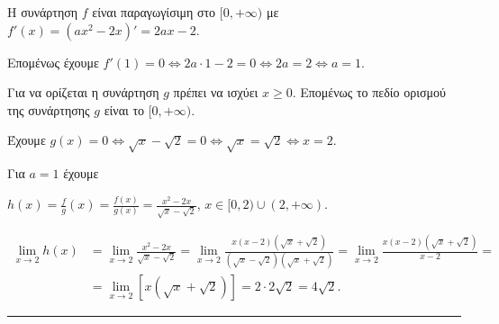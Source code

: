 \begin{alist}
\item Η συνάρτηση $f$ είναι παραγωγίσιμη στο $[0, +\infty)$ με $f'(x) = (ax^2 - 2x)' = 2ax - 2$.

Επομένως έχουμε $f'(1) = 0 \Leftrightarrow 2a \cdot 1 - 2 = 0 \Leftrightarrow 2a = 2 \Leftrightarrow a = 1$.

\item 
\begin{rlist}
\item Για να ορίζεται η συνάρτηση $g$ πρέπει να ισχύει $x \ge 0$. Επομένως το πεδίο ορισμού της συνάρτησης $g$ είναι το $[0, +\infty)$.

\item Έχουμε $g(x) = 0 \Leftrightarrow \sqrt{x} - \sqrt{2} = 0 \Leftrightarrow \sqrt{x} = \sqrt{2} \Leftrightarrow x = 2$.
\end{rlist}

\item Για $a=1$ έχουμε
\begin{rlist}
\item $h(x) = \frac{f}{g}(x) = \frac{f(x)}{g(x)} = \frac{x^2 - 2x}{\sqrt{x} - \sqrt{2}}$, $x \in [0, 2) \cup (2, +\infty)$.

\item 
\[
\begin{aligned}
\lim\limits_{x \to 2} h(x) &= \lim\limits_{x \to 2} \frac{x^2 - 2x}{\sqrt{x} - \sqrt{2}} = \lim\limits_{x \to 2} \frac{x(x - 2)(\sqrt{x} + \sqrt{2})}{(\sqrt{x} - \sqrt{2})(\sqrt{x} + \sqrt{2})} = \lim\limits_{x \to 2} \frac{x(x - 2)(\sqrt{x} + \sqrt{2})}{x - 2} = \\[1ex]
&= \lim\limits_{x \to 2} \left[ x(\sqrt{x} + \sqrt{2}) \right] = 2 \cdot 2\sqrt{2} = 4\sqrt{2}.
\end{aligned}
\]
\end{rlist}
\end{alist}
\vspace{6mm}
\noindent\rule{\textwidth}{0.4pt}
\vspace{6mm}


